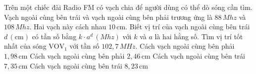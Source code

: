 \begin{ex}%
Trên một chiếc đài Radio FM có vạch chia để người dùng có thể dò sóng cần tìm. Vạch ngoài cùng bên trái và vạch ngoài cùng bên phải trương ứng là $88\, Mhz$ và $108\, Mhz$. Hai vạch này cách nhau $10\, \mathrm{cm}$. Biết vị trí của vạch ngoài cùng bên trái $d\, \left(\mathrm{cm}\right)$ có tần số bằng $k\cdot a^{d}\, \left(Mhz\right)$ với $k$ và $a$ là hai hằng số. Tìm vị trí tốt nhất của sóng $\mathrm{VOV}_{1}$ với tần số $102{,}7\, MHz$. 
\choice
	{Cách vạch ngoài cùng bên phải $1{,}98\, \mathrm{cm}$}
	{\True Cách vạch ngoài cùng bên phải $2{,}46\, \mathrm{cm}$}
	{Cách vạch ngoài cùng bên trái $7{,}35\, \mathrm{cm}$}
	{Cách vạch ngoài cùng bên trái $8{,}23\, \mathrm{cm}$}
\end{ex}



